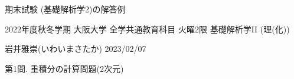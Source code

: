 \documentclass[dvipdfmx,a4paper,11pt]{article}
\newcommand{\R}{\mathbb{R}}
\theoremstyle{definition}
\begin{document}
\begin{center}
{\Large 期末試験 (基礎解析学2)の解答例}

{\small 2022年度秋冬学期 大阪大学 全学共通教育科目 火曜2限 基礎解析学II (理(化))}
\end{center}

\begin{flushright}
 岩井雅崇(いわいまさたか) 2023/02/07
\end{flushright}

{\Large 第1問.} 重積分の計算問題(2次元)
\vspace{11pt}



\begin{comment}

{\large(1). $D=\{ (x,y) \in \R^2 \,|\, x^2 + y^2 \leqq 1\}$とする. 
重積分$\iint_{D}\frac{1}{(1+x^2+y^2)^2} \, dxdy$の値を求めよ.}\vspace{7pt}

\hspace{-11pt}(解.) 
$E=[0,1]\times[0,2\pi]$とし, 
 $$
\begin{array}{ccccc}
\Phi: &E & \rightarrow & \R^2 & \\
&(r,\theta) & \longmapsto & (r \cos \theta , r \sin \theta)&
\end{array}
$$
とすると, 多重積分の変数変換の公式から
\begin{align*}
\begin{split}
\iint_{D}\frac{1}{(1+x^2+y^2)^2} \, dxdy
&=
\iint_{E} \frac{1}{(1+r^2)^2} |r|drd\theta =
\int_{0}^{2\pi} \left( \int_{0}^{1}\frac{r}{(1+r^2)^2}  dr\right)d\theta \\
&=\int_{0}^{2\pi} \left[ \frac{-1}{2(r^2 +1)}\right]_{0}^{1} d\theta 
=\int_{0}^{2\pi} \left( -\frac{1}{4} + \frac{1}{2} \right) d\theta 
=\frac{\pi}{2}.
    \end{split}
  \end{align*}
  \vspace{7pt}
  
  \end{comment}
  
\end{document}
